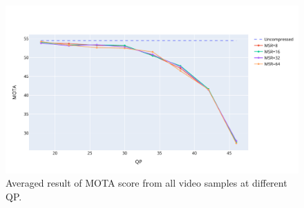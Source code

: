 \begin{figure}[!htbp]
  \centering
  \includegraphics[width=1.0\linewidth]{img/averaged_result_all_qp.pdf}
  \caption[Averaged result of MOTA score from all video samples at different QP]
  {Averaged result of MOTA score from all video samples at different QP.}
  \label{fig:averaged_result_all_qp}
\end{figure}